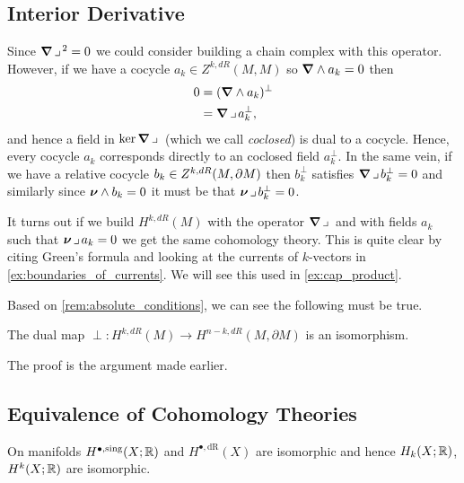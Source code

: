 \documentclass{article}
\begin{document}
\subsection{Interior Derivative}

Since $\boldsymbol{\nabla} \hspace*{.5mm}\lrcorner \hspace*{.5mm} ^2=0$ we could consider building a chain complex with this operator. However, if we have a cocycle $a_k \in Z^{k, dR}(M,M)$ so $\boldsymbol{\nabla} \wedge a_k =0$ then 
\begin{align}
    0 &= (\boldsymbol{\nabla} \wedge a_k)^\perp\\
      &= \boldsymbol{\nabla} \hspace*{.5mm}\lrcorner \hspace*{.5mm} a_k^\perp,
\end{align}
and hence a field in $\ker \boldsymbol{\nabla} \hspace*{.5mm}\lrcorner \hspace*{.5mm}$ (which we call \emph{coclosed}) is dual to a cocycle. Hence, every cocycle $a_k$ corresponds directly to an coclosed field $a_k^\perp$. In the same vein, if we have a relative cocycle $b_k\in Z^{k, dR}(M,{\partial M})$ then $b_k^\perp$ satisfies $\boldsymbol{\nabla} \hspace*{.5mm}\lrcorner \hspace*{.5mm} b_k^\perp =0$ and similarly since $\boldsymbol{\nu} \wedge b_k = 0$ it must be that $\boldsymbol{\nu} \hspace*{.5mm}\lrcorner \hspace*{.5mm} b_k^\perp = 0$. 

\begin{remark}
\label{rem:absolute_conditions}
It turns out if we build $H^{k,dR}(M)$ with the operator $\boldsymbol{\nabla} \hspace*{.5mm}\lrcorner \hspace*{.5mm}$ and with fields $a_k$ such that $\boldsymbol{\nu} \hspace*{.5mm}\lrcorner \hspace*{.5mm} a_k = 0$ we get the same cohomology theory. This is quite clear by citing Green's formula and looking at the currents of $k$-vectors in \cref{ex:boundaries_of_currents}. We will see this used in \cref{ex:cap_product}.
\end{remark}

Based on \cref{rem:absolute_conditions}, we can see the following must be true.
\begin{theorem}
The dual map $\perp \colon H^{k,dR}(M) \to H^{n-k, dR}(M,\partial M)$ is an isomorphism.
\end{theorem}
The proof is the argument made earlier.



\subsection{Equivalence of Cohomology Theories}

\begin{theorem}
On manifolds $H^{\bullet,\textrm{sing}}(X;\mathbb{R})$ and $H^{\bullet,\textrm{dR}}(X)$ are isomorphic and hence $H_{k}(X;\mathbb{R})$, $H^{k}(X;\mathbb{R})$ are isomorphic.
\end{theorem}
\end{document}
